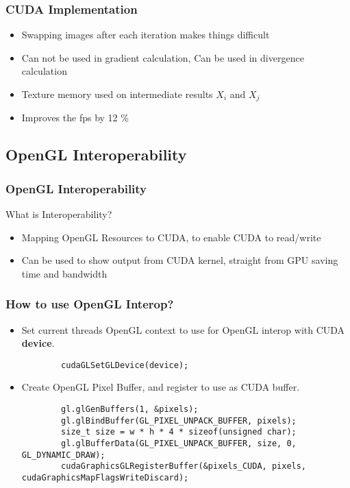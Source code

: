 \documentclass{beamer}
\begin{document}
\begin{frame}
  \frametitle{CUDA Implementation}
  \begin{itemize}
  \item Swapping images after each iteration makes things difficult

  \item Can not be used in gradient calculation, Can be used in divergence calculation

  \item Texture memory used on intermediate results $ X_i $ and $ X_j $
  
  \item Improves the fps by 12 \%
  
  \end{itemize}

\end{frame}

\subsection{OpenGL Interoperability}

\begin{frame}
\frametitle{OpenGL Interoperability}
What is Interoperability?
\begin{itemize}
	\item Mapping OpenGL Resources to CUDA, to enable CUDA to read/write
	\item Can be used to show output from CUDA kernel, straight from GPU saving time and bandwidth
\end{itemize}
\end{frame}


\begin{frame}[fragile]
	\frametitle{How to use OpenGL Interop?}
	\begin{itemize}
		\item Set current threads OpenGL context to use for OpenGL interop with CUDA \textbf{device}.
		\begin{lstlisting}
		cudaGLSetGLDevice(device);
		\end{lstlisting}
		\item Create OpenGL Pixel Buffer, and register to use as CUDA buffer.
		\begin{lstlisting}
		gl.glGenBuffers(1, &pixels);
		gl.glBindBuffer(GL_PIXEL_UNPACK_BUFFER, pixels);
		size_t size = w * h * 4 * sizeof(unsigned char);
		gl.glBufferData(GL_PIXEL_UNPACK_BUFFER, size, 0, GL_DYNAMIC_DRAW);
		cudaGraphicsGLRegisterBuffer(&pixels_CUDA, pixels, cudaGraphicsMapFlagsWriteDiscard);
		\end{lstlisting}
	\end{itemize}
\end{frame}
\end{document}

